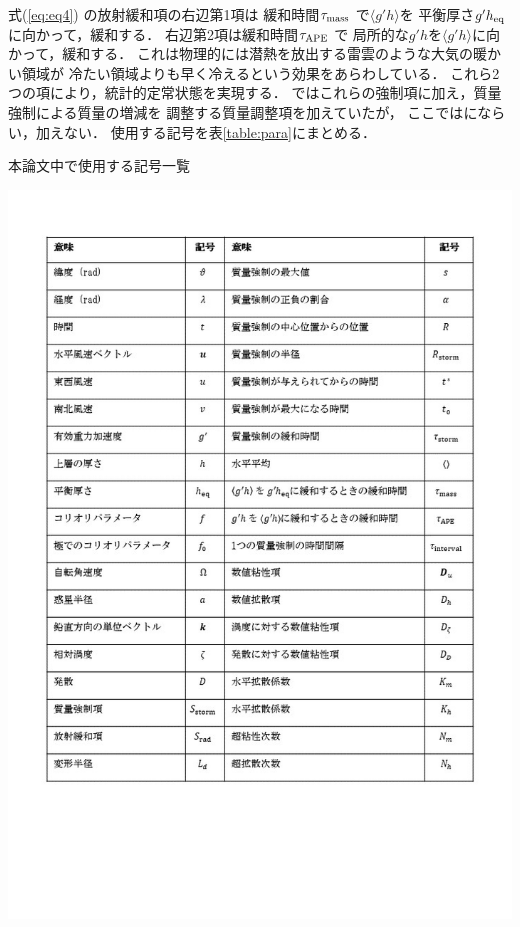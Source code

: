 \documentclass[a4j,12pt,openbib,oneside]{jreport}
\begin{document}
式(\ref{eq:eq4}) の放射緩和項の右辺第1項は
緩和時間$\tau_{{\rm{mass}}}$ で$\langle g'h \rangle $を
平衡厚さ$g'h_{{\rm{eq}}}$に向かって，緩和する．
%
右辺第2項は緩和時間$\tau_{{\rm{APE}}}$ で
局所的な$g'h$を$\langle g'h \rangle $に向かって，緩和する．
%
これは物理的には潜熱を放出する雷雲のような大気の暖かい領域が
冷たい領域よりも早く冷えるという効果をあらわしている．
%
これら2つの項により，統計的定常状態を実現する．
%
\cite{Brueshaber2019} ではこれらの強制項に加え，質量強制による質量の増減を
調整する質量調整項を加えていたが，
ここでは\cite{Showman2007}にならい，加えない．
使用する記号を表\ref{table:para}にまとめる．
\begin{table}[t]
  \caption{本論文中で使用する記号一覧}
  \label{table:para}
  \begin{center}
    \includegraphics[clip,width=15cm]{./fig/model/table_para-2.jpg}
  \end{center}
\end{table}
%
\clearpage
\newpage
\end{document}
